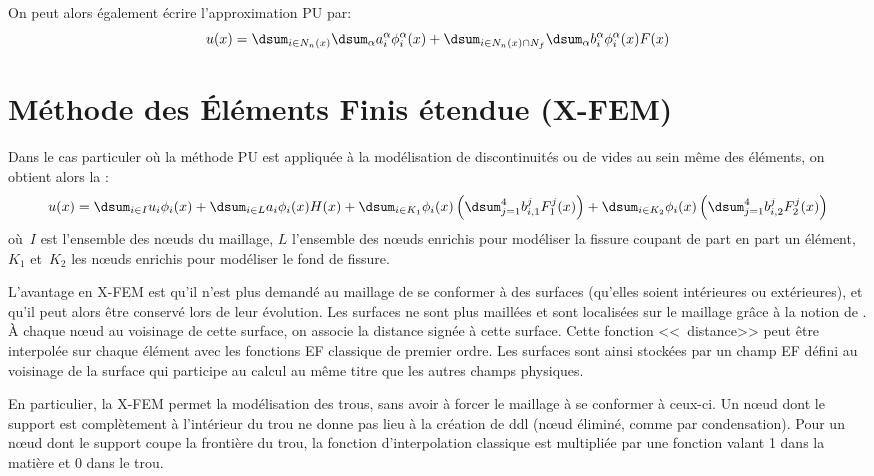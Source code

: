 On peut alors également écrire l'approximation PU par:
\begin{equation}
u(x) = \dsum_{i\in N_n(x)}\dsum_{\alpha} a_i^\alpha \phi_i^\alpha(x) +
\dsum_{i\in N_n(x)\cap N_f}\dsum_{\alpha} b_i^\alpha\phi_i^\alpha(x)F(x)
\end{equation}



\medskip
\section{Méthode des Éléments Finis étendue (X-FEM)}\label{Sec-XFEM}

Dans le cas particuler où la méthode PU 
est appliquée à la modélisation de
discontinuités ou de vides au sein même des éléments, on obtient alors la
:
\begin{equation}
u(x) = \dsum_{i\in I}u_i\phi_i(x) 
+ \dsum_{i\in L} a_i\phi_i(x) H(x)
+ \dsum_{i\in K_1}\phi_i(x)\left(\dsum_{j=1}^4b_{i,1}^jF_1^j(x)\right)
+ \dsum_{i\in K_2}\phi_i(x)\left(\dsum_{j=1}^4b_{i,2}^jF_2^j(x)\right)
\end{equation}
où~$I$ est l'ensemble des nœuds du maillage, $L$ l'ensemble des nœuds
enrichis pour modéliser la fissure coupant de part en part un élément, 
$K_1$ et~$K_2$ les nœuds enrichis pour modéliser le fond de fissure.

\medskip
L'avantage en X-FEM 
est qu'il n'est plus demandé au maillage de se conformer à des surfaces
(qu'elles soient intérieures ou extérieures), et qu'il peut alors être conservé lors de leur évolution.
Les surfaces ne sont plus maillées et sont localisées sur le maillage grâce à la notion de 
. À chaque nœud au voisinage de cette surface, on associe 
la distance signée à cette surface.
Cette fonction <<~distance>> peut être interpolée sur chaque élément avec les fonctions
EF classique de premier ordre. Les surfaces sont ainsi stockées par un champ EF défini
au voisinage de la surface qui participe au calcul au même titre que les autres champs physiques.

En particulier, la X-FEM 
permet la modélisation des trous, sans avoir à forcer le maillage à se conformer
à ceux-ci. Un nœud dont le support est complètement à l'intérieur du trou ne donne pas
lieu à la création de ddl (nœud éliminé, comme par condensation). 
Pour un nœud dont le support coupe la frontière du trou, la fonction d'interpolation classique est 
multipliée par une fonction valant 1 dans la matière et 0 dans le trou.





